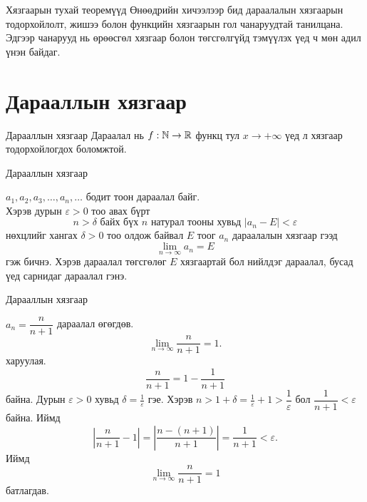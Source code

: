 

\begin{frame}[allowframebreaks]{Хязгаарын тухай теоремүүд}
\noindent Өнөөдрийн хичээлээр бид дараалалын хязгаарын тодорхойлолт, жишээ болон функцийн хязгаарын гол чанаруудтай танилцана. Эдгээр чанарууд нь өрөөсгөл хязгаар болон төгсгөлгүйд тэмүүлэх үед ч мөн адил үнэн байдаг.
\end{frame}

\section{Дарааллын хязгаар}
\begin{frame}[allowframebreaks]{Дарааллын хязгаар}
Дараалал нь $f:\mathbb{N}\to\mathbb{R}$ функц тул  $x\to+\infty$ үед л хязгаар тодорхойлогдох боломжтой.\,
\end{frame}

\begin{frame}[allowframebreaks]{Дарааллын хязгаар}
\begin{definition}
 $ a_1, a_2, a_3, \ldots, a_n, \ldots$ бодит тоон дараалал байг. \\
Хэрэв дурын $\varepsilon>0$  тоо авах бүрт  
$$n>\delta \text{ байх бүх } n \text{ натурал тооны хувьд } |a_n-E|<\varepsilon$$
нөхцлийг хангах $\delta>0$ тоо олдож байвал $E$ тоог $a_n$ дараалалын  хязгаар гээд $$\lim\limits_{n\to  \infty}a_n=E$$ гэж бичнэ.   Хэрэв дараалал төгсгөлөг $E$ хязгаартай бол нийлдэг дараалал, бусад үед сарнидаг дараалал гэнэ.
\end{definition} 
\end{frame}

\begin{frame}[allowframebreaks]{Дарааллын хязгаар}
\begin{example}
$a_n = \dfrac{n}{n+1}$ дараалал өгөгдөв.  \[
\lim_{n\to\infty}\frac{n}{n+1}=1.
\] харуулая.
\[
\frac{n}{n+1}=1-\frac{1}{n+1}
\]  байна.
Дурын $\varepsilon>0$ хувьд $\delta=\frac{1}{\varepsilon}$ гэе. Хэрэв $n>1+\delta=\frac{1}{\varepsilon}+1>\dfrac{1}{\varepsilon}$ бол $\dfrac{1}{n+1}<\varepsilon$ байна. Иймд 
\[
\left|\frac{n}{n+1}-1\right| =\left|\frac{n-(n+1)}{n+1}\right|=\frac{1}{n+1}< \varepsilon.
\]
Иймд
\[
\lim_{n\to\infty}\frac{n}{n+1}=1
\] батлагдав.
\end{example}
\end{frame}

